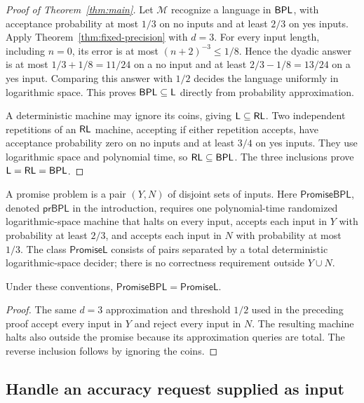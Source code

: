 \begin{proof}[Proof of Theorem~\ref{thm:main}]
Let $\mathcal M$ recognize a language in $\mathsf{BPL}$, with acceptance
probability at most $1/3$ on no inputs and at least $2/3$ on yes
inputs. Apply Theorem~\ref{thm:fixed-precision} with $d=3$.
For every input length, including $n=0$, its error is at most
$(n+2)^{-3}\le1/8$. Hence the dyadic answer is at most
$1/3+1/8=11/24$ on a no input and at least
$2/3-1/8=13/24$ on a yes input. Comparing this answer with $1/2$
decides the language uniformly in logarithmic space. This proves
$\mathsf{BPL}\subseteq\mathsf L$ directly from probability approximation.

A deterministic machine may ignore its coins, giving
$\mathsf L\subseteq\mathsf{RL}$. Two independent repetitions of an $\mathsf{RL}$
machine, accepting if either repetition accepts, have acceptance
probability zero on no inputs and at least $3/4$ on yes inputs.
They use logarithmic space and polynomial time, so
$\mathsf{RL}\subseteq\mathsf{BPL}$. The three inclusions prove
$\mathsf L=\mathsf{RL}=\mathsf{BPL}$.
\end{proof}

A promise problem is a pair $(Y,N)$ of disjoint sets of inputs.
Here $\mathsf{PromiseBPL}$, denoted $\mathsf{prBPL}$ in the introduction,
requires one polynomial-time randomized
logarithmic-space machine that halts on every input, accepts each
input in $Y$ with probability at least $2/3$, and accepts each
input in $N$ with probability at most $1/3$.
The class $\mathsf{PromiseL}$ consists of pairs separated by a total
deterministic logarithmic-space decider; there is no correctness
requirement outside $Y\cup N$.

\begin{corollary}\label{cor:promise-bpl}
Under these conventions,
$\mathsf{PromiseBPL}=\mathsf{PromiseL}$.
\end{corollary}

\begin{proof}
The same $d=3$ approximation and threshold $1/2$ used in the preceding
proof accept every input in $Y$ and reject every input in $N$.
The resulting machine halts also outside the promise because its
approximation queries are total. The reverse inclusion follows by
ignoring the coins.
\end{proof}

\subsection{Handle an accuracy request supplied as input}


